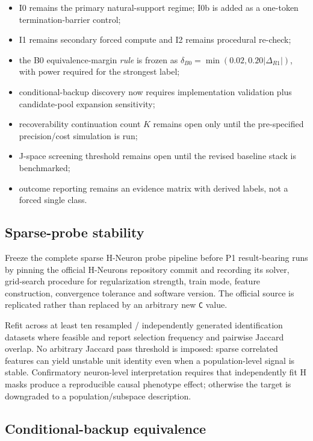 \begin{itemize}
\tightlist
\item I0 remains the primary natural-support regime; I0b is added as a one-token termination-barrier control;
\item I1 remains secondary forced compute and I2 remains procedural re-check;
\item the B0 equivalence-margin \emph{rule} is frozen as \(\delta_{B0}=\min(0.02,0.20|\Delta_{R1}|)\), with power required for the strongest label;
\item conditional-backup discovery now requires implementation validation plus candidate-pool expansion sensitivity;
\item recoverability continuation count \(K\) remains open only until the pre-specified precision/cost simulation is run;
\item J-space screening threshold remains open until the revised baseline stack is benchmarked;
\item outcome reporting remains an evidence matrix with derived labels, not a forced single class.
\end{itemize}

\subsection{Sparse-probe stability}\label{sparse-probe-stability}

Freeze the complete sparse H-Neuron probe pipeline before P1 result-bearing runs by pinning the official H-Neurons repository commit and recording its solver, grid-search procedure for regularization strength, train mode, feature construction, convergence tolerance and software version. The official source is replicated rather than replaced by an arbitrary new \texttt{C} value.

Refit across at least ten resampled / independently generated identification datasets where feasible and report selection frequency and pairwise Jaccard overlap. No arbitrary Jaccard pass threshold is imposed: sparse correlated features can yield unstable unit identity even when a population-level signal is stable. Confirmatory neuron-level interpretation requires that independently fit H masks produce a reproducible causal phenotype effect; otherwise the target is downgraded to a population/subspace description.

\subsection{Conditional-backup equivalence}\label{conditional-backup-equivalence}

